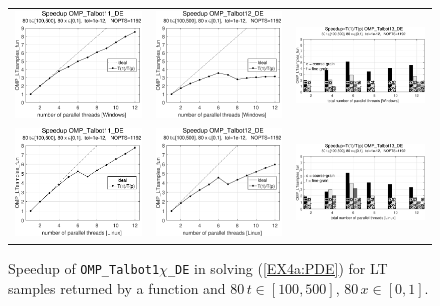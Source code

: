 \documentclass[a4paper,10pt]{report}%
\begin{document}
\begin{figure}[htb]
\centering
\begin{tabular}{ccc} %
\includegraphics[height=0.2\textwidth]{./FIGS/EX4a/EX4a_fun_speedup_11_80t_100_Windows.eps} &
\includegraphics[height=0.2\textwidth]{./FIGS/EX4a/EX4a_fun_speedup_12_80t_100_Windows.eps} &
\includegraphics[height=0.2\textwidth,keepaspectratio=true]{./FIGS/EX4a/EX4a_fun_speedup_13_80t_100_Windows.eps} \\
\includegraphics[height=0.2\textwidth]{./FIGS/EX4a/EX4a_fun_speedup_11_80t_100_Linux.eps} &
\includegraphics[height=0.2\textwidth]{./FIGS/EX4a/EX4a_fun_speedup_12_80t_100_Linux.eps} &
\includegraphics[height=0.2\textwidth,keepaspectratio=true]{./FIGS/EX4a/EX4a_fun_speedup_13_80t_100_Linux.eps}
\end{tabular}
\caption{\small Speedup of {\tt OMP\_Talbot1$\chi$\_DE} in solving (\ref{EX4a:PDE}) for LT samples
returned by a function and $80\,t\in[100,500]$, $80\,x\in[0,1]$.}
\label{PAR_EX4a_speedup_fun3}
\end{figure}
\end{document}
